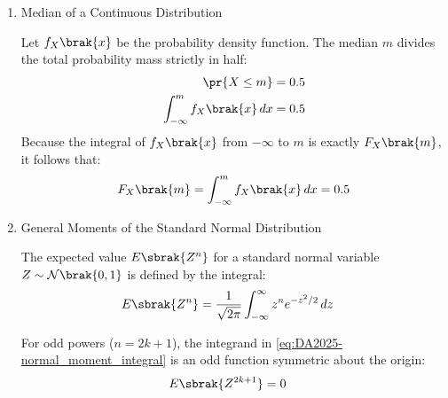 \begin{enumerate}[label=\thesubsection.\arabic*, ref=\thesubsection.\theenumi]
\begin{align}
		\\
		k=4 &\implies h\brak{4, 0} = 2
		\\
		k=5 &\implies h\brak{5, 0} = 5
		\\
		k=6 &\implies h\brak{6, 0} = 8
		\\
		k=14 &\implies h\brak{14, 0} = 2
		\\
		&\implies h\brak{14, 1} = 3
		\\
		&\implies h\brak{14, 2} = 4
		\\
		k=15 &\implies h\brak{15, 0} = 5
		\\
		&\implies h\brak{15, 1} = 6
	\end{align}
	\item Median of a Continuous Distribution
	
	Let $f_X\brak{x}$ be the probability density function. The median $m$ divides the total probability mass strictly in half:
	\begin{align}
		\pr{X \le m} &= 0.5
		\\
		\int_{-\infty}^{m} f_X\brak{x} \, dx &= 0.5
	\end{align}
	Because the integral of $f_X\brak{x}$ from $-\infty$ to $m$ is exactly $F_X\brak{m}$, it follows that:
	\begin{align}
		F_X\brak{m} = \int_{-\infty}^{m} f_X\brak{x} \, dx = 0.5 \label{eq:DA2025-median}
	\end{align}
	
\item General Moments of the Standard Normal Distribution

The expected value $E\sbrak{Z^n}$ for a standard normal variable $Z \sim \mathcal{N}\brak{0, 1}$ is defined by the integral:
\begin{align}
	E\sbrak{Z^n} &= \frac{1}{\sqrt{2\pi}} \int_{-\infty}^{\infty} z^n e^{-z^2/2} \,dz \label{eq:DA2025-normal_moment_integral}
\end{align}

For odd powers ($n = 2k + 1$), the integrand in \eqref{eq:DA2025-normal_moment_integral} is an odd function symmetric about the origin:
\begin{align}
	E\sbrak{Z^{2k+1}} &= 0 \label{eq:DA2025-normal_moment_odd}
\end{align}


\end{enumerate}
